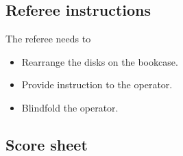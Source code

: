 \subsection{Referee instructions}
The referee needs to
\begin{itemize}
	\item Rearrange the disks on the bookcase.
	\item Provide instruction to the operator.
	\item Blindfold the operator.
\end{itemize}


\subsection{Score sheet}


